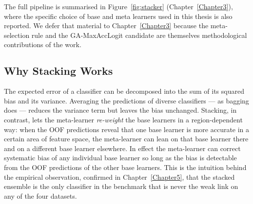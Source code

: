 The full pipeline is summarised in
Figure~\ref{fig:stacker} (Chapter~\ref{Chapter3}), where the
specific choice of base and meta learners used in this thesis is
also reported. We defer that material to Chapter~\ref{Chapter3}
because the meta-selection rule and the GA-MaxAccLogit
candidate are themselves methodological contributions of the work.

\subsection{Why Stacking Works}

The expected error of a classifier can be decomposed into the
sum of its squared bias and its variance. Averaging the
predictions of diverse classifiers --- as bagging does --- reduces
the variance term but leaves the bias unchanged. Stacking, in
contrast, lets the meta-learner \emph{re-weight} the base learners
in a region-dependent way: when the OOF predictions reveal that
one base learner is more accurate in a certain area of feature
space, the meta-learner can lean on that base learner there and
on a different base learner elsewhere. In effect the meta-learner
can correct systematic bias of any individual base learner so
long as the bias is detectable from the OOF predictions of the
other base learners. This is the
intuition behind the empirical observation, confirmed in
Chapter~\ref{Chapter5}, that the stacked ensemble is the only
classifier in the benchmark that is never the weak link on any
of the four datasets.
